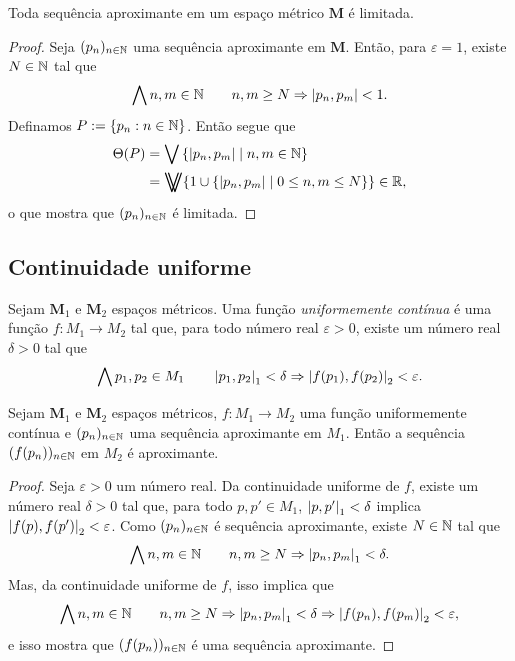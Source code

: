 \begin{proposition}
Toda sequência aproximante em um espaço métrico $\bm M$ é limitada.
\end{proposition}
\begin{proof}
Seja $(p_n)_{n \in \mathbb{N}}$ uma sequência aproximante em $\bm M$. Então, para $\varepsilon=1$, existe $N \in \mathbb{N}$ tal que
	\begin{equation*}
	\bigwedge\nolimits n,m \in \mathbb{N} \qquad n,m \geq N \Rightarrow \left\vert{p_n},{p_m}\right\vert<1.
	\end{equation*}
	Definamos $P := \{p_n : n \in \mathbb{N}\}$. Então segue que
	\begin{align*}
	\diam(P) &= \sup \set{\dist{p_n}{p_m}}{n,m \in \N} \\
		&= \max\{1 \cup \set{\dist{p_n}{p_m}}{0 \leq n,m \leq N}\} \in \R,
	\end{align*}
o que mostra que $(p_n)_{n \in \mathbb{N}}$ é limitada.
\end{proof}

\subsection{Continuidade uniforme}

\begin{definition}
Sejam $\bm M_1$ e $\bm M_2$ espaços métricos. Uma função \emph{uniformemente contínua} é uma função $f: M_1 \to M_2$ tal que, para todo número real $\varepsilon > 0$, existe um número real $\delta > 0$ tal que
	\begin{equation*}
	\bigwedge\nolimits p_1,p_2 \in M_1 \qquad \left\vert{p_1},{p_2}\right\vert_1 < \delta \Rightarrow \left\vert{f(p_1)},{f(p_2)}\right\vert_2 < \varepsilon.
	\end{equation*}
\end{definition}

\begin{proposition}
Sejam $\bm M_1$ e $\bm M_2$ espaços métricos, $f: M_1 \to M_2$ uma função uniformemente contínua e $(p_n)_{n \in \mathbb{N}}$ uma sequência aproximante em $M_1$. Então a sequência $(f(p_n))_{n \in \mathbb{N}}$ em $M_2$ é aproximante.
\end{proposition}
\begin{proof}
Seja $\varepsilon > 0$ um número real. Da continuidade uniforme de $f$, existe um número real $\delta > 0$ tal que, para todo $p,p' \in M_1$, $\left\vert{p},{p'}\right\vert_1 < \delta$ implica $\left\vert{f(p)},{f(p')}\right\vert_2 < \varepsilon$. Como $(p_n)_{n \in \mathbb{N}}$ é sequência aproximante, existe $N \in \mathbb{N}$ tal que
	\begin{equation*}
	\bigwedge\nolimits n,m \in \mathbb{N} \qquad n,m \geq N \Rightarrow \left\vert{p_n},{p_m}\right\vert_1 < \delta.
	\end{equation*}
Mas, da continuidade uniforme de $f$, isso implica que
	\begin{equation*}
	\bigwedge\nolimits n,m \in \mathbb{N} \qquad n,m \geq N \Rightarrow \left\vert{p_n},{p_m}\right\vert_1 < \delta \Rightarrow \left\vert{f(p_n)},{f(p_m)}\right\vert_2 < \varepsilon,
	\end{equation*}
e isso mostra que $(f(p_n))_{n \in \mathbb{N}}$ é uma sequência aproximante.
\end{proof}


